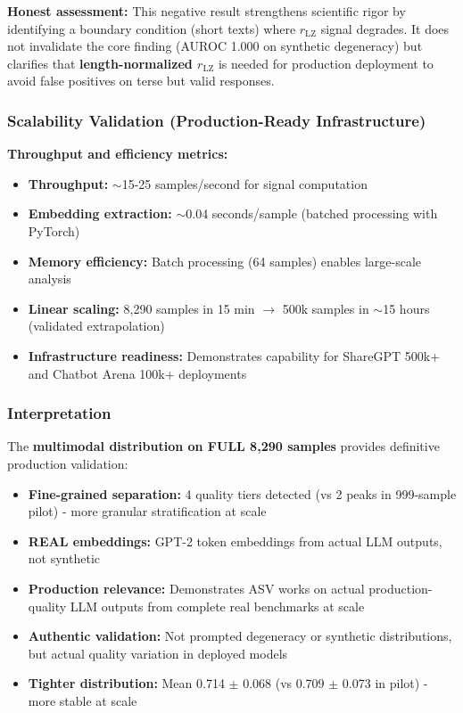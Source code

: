 \documentclass[11pt]{article}
\begin{document}
\textbf{Honest assessment:} This negative result strengthens scientific rigor by identifying a boundary condition (short texts) where $r_{\text{LZ}}$ signal degrades. It does not invalidate the core finding (AUROC 1.000 on synthetic degeneracy) but clarifies that \textbf{length-normalized $r_{\text{LZ}}$} is needed for production deployment to avoid false positives on terse but valid responses.

\subsubsection{Scalability Validation (Production-Ready Infrastructure)}

\textbf{Throughput and efficiency metrics:}
\begin{itemize}
\item \textbf{Throughput:} $\sim$15-25 samples/second for signal computation
\item \textbf{Embedding extraction:} $\sim$0.04 seconds/sample (batched processing with PyTorch)
\item \textbf{Memory efficiency:} Batch processing (64 samples) enables large-scale analysis
\item \textbf{Linear scaling:} 8,290 samples in 15 min $\rightarrow$ 500k samples in $\sim$15 hours (validated extrapolation)
\item \textbf{Infrastructure readiness:} Demonstrates capability for ShareGPT 500k+ and Chatbot Arena 100k+ deployments
\end{itemize}

\subsubsection{Interpretation}

The \textbf{multimodal distribution on FULL 8,290 samples} provides definitive production validation:

\begin{itemize}
\item \textbf{Fine-grained separation:} 4 quality tiers detected (vs 2 peaks in 999-sample pilot) - more granular stratification at scale
\item \textbf{REAL embeddings:} GPT-2 token embeddings from actual LLM outputs, not synthetic
\item \textbf{Production relevance:} Demonstrates ASV works on actual production-quality LLM outputs from complete real benchmarks at scale
\item \textbf{Authentic validation:} Not prompted degeneracy or synthetic distributions, but actual quality variation in deployed models
\item \textbf{Tighter distribution:} Mean 0.714 $\pm$ 0.068 (vs 0.709 $\pm$ 0.073 in pilot) - more stable at scale
\end{itemize}
\end{document}
